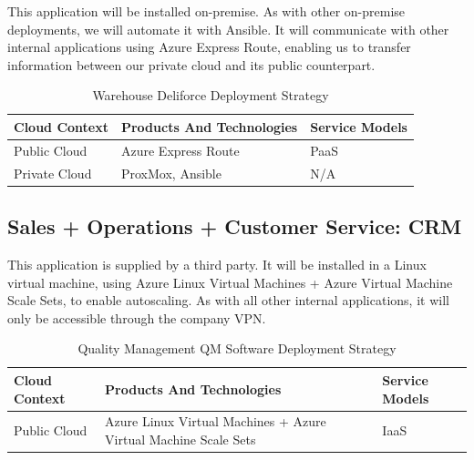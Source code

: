 \documentclass{llncs}
\begin{document}
This application will be installed on-premise. As with other on-premise deployments, we will automate it with Ansible.
It will communicate with other internal applications using Azure Express Route, enabling us to transfer information between our private cloud and its public counterpart.\\

\begin{table}[h!]
    \centering
    \begin{tabular}{lll}
        \hline
        \textbf{Cloud Context} & \textbf{Products And Technologies} & \textbf{Service Models} \\
        \hline
 Public Cloud           & Azure Express Route                & PaaS                    \\
        \hline
 Private Cloud          & ProxMox, Ansible                   & N/A                     \\
        \hline
    \end{tabular}
    \caption{Warehouse Deliforce Deployment Strategy}
\end{table}

\subsection{Sales + Operations + Customer Service: CRM}

This application is supplied by a third party. It will be installed in a Linux virtual machine, using Azure Linux Virtual Machines + Azure Virtual Machine Scale Sets, to enable autoscaling.
As with all other internal applications, it will only be accessible through the company VPN.\\

\begin{table}[h!]
    \centering
    \begin{tabular}{lll}
        \hline
        \textbf{Cloud Context} & \textbf{Products And Technologies}                              & \textbf{Service Models} \\
        \hline
 Public Cloud           & Azure Linux Virtual Machines + Azure Virtual Machine Scale Sets & IaaS                    \\
    \end{tabular}
    \caption{Quality Management QM Software Deployment Strategy}
\end{table}
\end{document}
